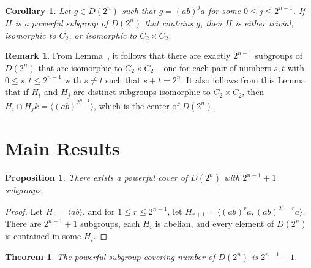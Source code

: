 \documentclass{amsart}
\numberwithin{equation} {section}
\newtheorem{theorem}[equation]{Theorem}
\newtheorem{proposition}[equation]{Proposition}
\newtheorem{corollary}[equation]{Corollary}
\theoremstyle{definition}
\newtheorem*{remark}{Remark}
\begin{document}
\begin{corollary}
Let $g \in D(2^n)$ such that $g = (ab)^ja$ for some $0 \leq j \leq 2^{n-1}$. If $H$ is a powerful subgroup of $D(2^n)$ that contains $g$, then $H$ is either trivial, isomorphic to $C_2$, or isomorphic to $C_2 \times C_2$. 
\end{corollary}

\begin{remark}\label{r:count-and-intersection-C2}
From Lemma~\cite{l:copies-of-C2-times-C2}, it follows that there are exactly $2^{n-1}$ subgroups of $D(2^n)$ that are isomorphic to $C_2 \times C_2$ -- one for each pair of numbers $s,t$ with $0 \leq s, t \leq 2^{n-1}$ with $s \neq t$ such that $s+t = 2^n$. It also follows from this Lemma that if $H_i$ and $H_j$ are distinct subgroups isomorphic to $C_2 \times C_2$, then $H_i \cap H_jk = \langle (ab)^{2^{n-1}} \rangle $, which is the center of $D(2^n)$. 
\end{remark}

\section{Main Results}

\begin{proposition}\label{p:upper-bound-covering-number} 
There exists a powerful cover of $D(2^n)$ with $2^{n-1} + 1$ subgroups. 
\end{proposition}

\begin{proof}
Let $H_1 = \langle ab \rangle$, and for $1 \leq r \leq 2^{n+1}$, let $H_{r+1} = \langle (ab)^{r}a, (ab)^{2^n - r}a \rangle$. There are $2^{n-1}+1$ subgroups, each $H_i$ is abelian, and every element of $D(2^n)$ is contained in some $H_i$.  
\end{proof}

\begin{theorem}\label{t:main-result}
The powerful subgroup covering number of $D(2^n)$ is $2^{n-1}+1$.
\end{theorem}
\end{document}
